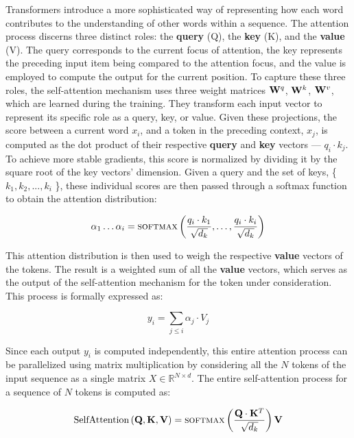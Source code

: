 Transformers introduce a more sophisticated way of representing how each word contributes to the understanding of other words within a sequence. The attention process discerns three distinct roles: the \textbf{query} (Q), the \textbf{key} (K), and the \textbf{value} (V). The query corresponds to the current focus of attention, the key represents the preceding input item being compared to the attention focus, and the value is employed to compute the output for the current position. To capture these three roles, the self-attention mechanism uses three weight matrices ${\mathbf W}^q$, ${\mathbf W}^k$, ${\mathbf W}^v$, which are learned during the training. They transform each input vector to represent its specific role as a query, key, or value. Given these projections, the score between a current word $x_i$, and a token in the preceding context, $x_j$, is computed as the dot product of their respective \textbf{query} and \textbf{key} vectors --- $q_i \cdot k_j$. To achieve more stable gradients, this score is normalized by dividing it by the square root of the key vectors' dimension. Given a query and the set of keys, \{ $k_1,k_2,...,k_i$ \}, these individual scores are then passed through a softmax function to obtain the attention distribution:   

\begin{equation}
\alpha_1\ldots \alpha_i = \textsc{softmax} \left ( \frac{q_i \cdot k_1}{\sqrt{d_k}},\ldots,\frac{q_i \cdot k_i}{\sqrt{d_k}} \right ) 
\end{equation}
 
\noindent This attention distribution is then used to weigh the respective \textbf{value} vectors of the tokens. The result is a weighted sum of all the \textbf{value} vectors, which serves as the output of the self-attention mechanism for the token under consideration. This process is formally expressed as:

\begin{equation}
y_i = \sum_{j \leq i}{\alpha_{j} \cdot V_j}
\end{equation}

\noindent Since each output $y_i$ is computed independently, this entire attention process can be parallelized using matrix multiplication by considering all the $N$ tokens of the input sequence as a single matrix $X \in \mathbb{R}^{N \times d}$. The entire self-attention process for a sequence of $N$ tokens is computed as:

\begin{equation}
\text{SelfAttention}\left({\mathbf Q},{\mathbf K},{\mathbf V}\right) = \textsc{softmax} \left (\frac{{\mathbf Q} \cdot {\mathbf K}^T}{\sqrt{d_k}} \right ) {\mathbf V}
\end{equation}

